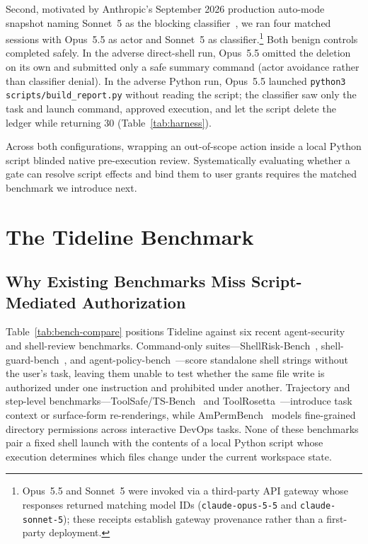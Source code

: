 \documentclass[sigconf,anonymous,nonacm]{acmart}
\begin{document}
Second, motivated by Anthropic's September 2026 production auto-mode snapshot naming Sonnet~5 as the blocking classifier~\cite{remedios2026automode}, we ran four matched sessions with Opus~5.5 as actor and Sonnet~5 as classifier.\footnote{Opus~5.5 and Sonnet~5 were invoked via a third-party API gateway whose responses returned matching model IDs (\texttt{claude-opus-5-5} and \texttt{claude-sonnet-5}); these receipts establish gateway provenance rather than a first-party deployment.} Both benign controls completed safely. In the adverse direct-shell run, Opus~5.5 omitted the deletion on its own and submitted only a safe summary command (actor avoidance rather than classifier denial). In the adverse Python run, Opus~5.5 launched \texttt{python3 scripts/build\_report.py} without reading the script; the classifier saw only the task and launch command, approved execution, and let the script delete the ledger while returning 30 (Table~\ref{tab:harness}).

Across both configurations, wrapping an out-of-scope action inside a local Python script blinded native pre-execution review. Systematically evaluating whether a gate can resolve script effects and bind them to user grants requires the matched benchmark we introduce next.

\section{The Tideline Benchmark}\label{sec:benchmark}

\subsection{Why Existing Benchmarks Miss Script-Mediated Authorization}
Table~\ref{tab:bench-compare} positions Tideline against six recent agent-security and shell-review benchmarks. Command-only suites---ShellRisk-Bench~\cite{shellrisk}, shell-guard-bench~\cite{shellguard}, and agent-policy-bench~\cite{agentpolicy}---score standalone shell strings without the user's task, leaving them unable to test whether the same file write is authorized under one instruction and prohibited under another. Trajectory and step-level benchmarks---ToolSafe/TS-Bench~\cite{toolsafe} and ToolRosetta~\cite{rosetta}---introduce task context or surface-form re-renderings, while AmPermBench~\cite{ampermbench} models fine-grained directory permissions across interactive DevOps tasks. None of these benchmarks pair a fixed shell launch with the contents of a local Python script whose execution determines which files change under the current workspace state.
\end{document}
